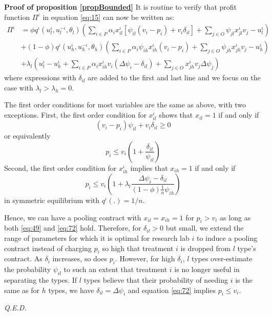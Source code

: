 \documentclass[a4paper,12pt]{article}
\newcommand{\qed}{\hspace*{\fill} {\em Q.E.D.}}
\begin{document}
\textbf{Proof of proposition \ref{propBounded}}
It is routine to verify that profit function \(\Pi^{\iota}\) in equation \eqref{eq:15} can now be written as:
\begin{equation}
\label{eq:15b}
\begin{split}
\Pi^{\iota} &= \phi q^{\iota}(u_l^{\iota},u_l^{-\iota},\theta_l) (\sum_{i \in P} \alpha_i x_{il}^{\iota}[\psi_{il}(v_i-p_i)+v_i \delta_{il}] + \sum_{j \in O} \psi_{jl} x_{jl}^{\iota} v_j - u_l^{\iota}) \\
    &+ (1-\phi) q^{\iota}(u_h^{\iota},u_h^{-\iota},\theta_h) (\sum_{i \in P} \alpha_i \psi_{ih} x_{ih}^{\iota} (v_i-p_i) + \sum_{j \in O} \psi_{jh} x_{jh}^{\iota} v_j - u_h^{\iota}) \\
    &+ \lambda_l (u_l^{\iota} - u_h^{\iota} + \sum_{i \in P} \alpha_i x_{ih}^{\iota} v_i (\Delta\psi_{i}-\delta_{il}) + \sum_{j \in O} x_{jh}^{\iota} v_j \Delta\psi_{j})
\end{split}
\end{equation}
where expressions with \(\delta_{il}\) are added to the first and last line and we focus on the case with \(\lambda_l>\lambda_h =0\).

The first order conditions for most variables are the same as above, with two exceptions. First, the first order condition for \(x_{il}^{\iota}\) shows that \(x_{il}=1\) if and only if
\begin{equation}
\label{eq:44}
(v_i-p_i)\psi_{il}+v_i \delta_{il} \geq 0
\end{equation}
or equivalently
\begin{equation}
\label{eq:49}
p_i \leq v_i \left(1+\frac{\delta_{il}}{\psi_{il}} \right)
\end{equation}
Second, the first order condition for \(x_{ih}^{\iota}\) implies that \(x_{ih}=1\) if and only if
\begin{equation}
\label{eq:72}
p_i \leq v_i \left(1+\lambda_l \frac{\Delta \psi_i -\delta_{il}}{(1-\phi)\frac{1}{n} \psi_{ih}} \right)
\end{equation}
in symmetric equilibrium with \(q^{\iota}(.)=1/n\).

Hence, we can have a pooling contract with \(x_{il}=x_{ih}=1\) for \(p_i>v_i\) as long as both \eqref{eq:49} and \eqref{eq:72} hold. Therefore, for \(\delta_{il} > 0\) but small, we extend the range of parameters for which it is optimal for research lab \(i\) to induce a pooling contract instead of charging \(p_i\) so high that treatment \(i\) is dropped from \(l\) type's contract. As \(\delta_i\) increases, so does \(p_i\). However, for high \(\delta_i\), \(l\) types over-estimate the probability \(\psi_{il}\) to such an extent that treatment \(i\) is no longer useful in separating the types. If \(l\) types believe that their probability of needing \(i\) is the same as for \(h\) types, we have \(\delta_{il} = \Delta \psi_i\) and equation \eqref{eq:72} implies \(p_i \leq v_i\).

 \qed
\end{document}

